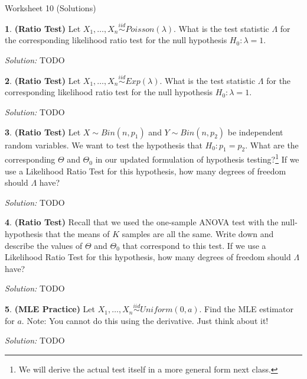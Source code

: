 \documentclass{tufte-handout}
\newcommand{\iid}{\stackrel{iid}{\sim}}
\begin{document}
\justify

{\LARGE Worksheet 10 (Solutions)}

\vspace*{18pt}


\textbf{1}. \textbf{(Ratio Test)} Let $X_1, \ldots, X_n \iid Poisson(\lambda)$.
What is the test statistic $\Lambda$ for the corresponding likelihood 
ratio test for the null hypothesis $H_0: \lambda = 1$.

\textit{Solution:} TODO

\textbf{2}. \textbf{(Ratio Test)} Let $X_1, \ldots, X_n \iid Exp(\lambda)$.
What is the test statistic $\Lambda$ for the corresponding likelihood 
ratio test for the null hypothesis $H_0: \lambda = 1$.

\textit{Solution:} TODO

\textbf{3}. \textbf{(Ratio Test)} Let $X \sim Bin(n, p_1)$ and $Y \sim Bin(n, p_2)$ be
independent random variables. We want to test the hypothesis that
$H_0: p_1 = p_2$. What are the corresponding $\Theta$ and $\Theta_0$ in
our updated formulation of hypothesis testing?\footnote{
  We will derive the actual test itself in a more general form next
  class.
} If we use a Likelihood Ratio Test for this hypothesis, how many degrees of
freedom should $\Lambda$ have?

\textit{Solution:} TODO

\textbf{4}. \textbf{(Ratio Test)} Recall that we used the one-sample ANOVA test with the
null-hypothesis that the means of $K$ samples are all the same. Write down and
describe the values of $\Theta$ and $\Theta_0$ that correspond to this test. 
If we use a Likelihood Ratio Test for this hypothesis, how many degrees of
freedom should $\Lambda$ have?

\textit{Solution:} TODO

\textbf{5}. \textbf{(MLE Practice)} Let $X_1, \ldots, X_n \iid Uniform(0, a)$. Find the MLE
estimator for $a$. Note: You cannot do this using the derivative. Just think about it!

\textit{Solution:} TODO
\end{document}
